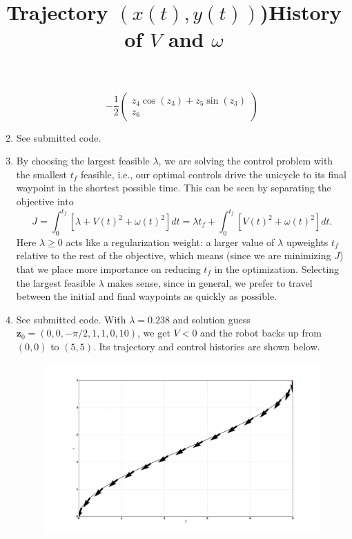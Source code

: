 \documentclass[12pt]{article}
\begin{document}
\begin{enumerate}
\begin{equation}
		-\frac{1}{2}\left(\begin{array}{c}
		z_4\cos(z_3) + z_5\sin(z_3) \\
		z_6
		\end{array}\right)
	\end{equation}
	\item See submitted code.
	\item By choosing the largest feasible $\lambda$, we are solving the control problem with the smallest $t_f$ feasible, i.e., our optimal controls drive the unicycle to its final waypoint in the shortest possible time. This can be seen by separating the objective into
	\[
		J = \int_0^{t_f} [\lambda + V(t)^2 + \omega(t)^2]dt = \lambda t_f + \int_0^{t_f} [V(t)^2 + \omega(t)^2]dt.
	\]
	Here $\lambda \geq 0$ acts like a regularization weight: a larger value of $\lambda$ upweights $t_f$ relative to the rest of the objective, which means (since we are minimizing $J$) that we place more importance on reducing $t_f$ in the optimization. Selecting the largest feasible $\lambda$ makes sense, since in general, we prefer to travel between the initial and final waypoints as quickly as possible.
	\item See submitted code. With $\lambda = 0.238$ and solution guess $\mathbf{z}_0 = (0, 0, -\pi/2, 1, 1, 0, 10)$, we get $V < 0$ and the robot backs up from $(0,0)$ to $(5,5)$. Its trajectory and control histories are shown below.
	\begin{figure}[H]
		\centering
		\title{\bf Trajectory $(x(t), y(t))$)}
		\includegraphics[width=\textwidth]{../Figures/hw1_1_iv_a.png}
	\end{figure}
	\begin{figure}[H]
		\centering
		\title{\bf History of $V$ and $\omega$}

\end{figure}
\end{enumerate}
\end{document}
